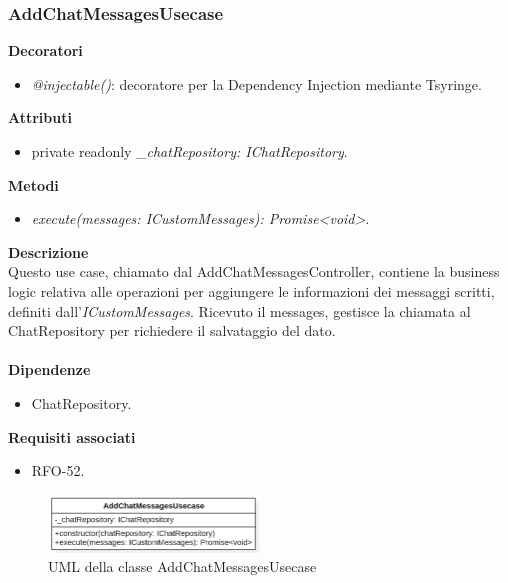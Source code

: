 \subsubsection{AddChatMessagesUsecase}
\textbf{Decoratori}
\begin{itemize}
    \item \textit{@injectable()}: decoratore per la Dependency Injection mediante Tsyringe.
\end{itemize}
\textbf{Attributi}
\begin{itemize}
    \item private readonly \textit{\_chatRepository: IChatRepository}.
\end{itemize}
\textbf{Metodi}
\begin{itemize}
    \item \textit{execute(messages: ICustomMessages): Promise<void>}.
\end{itemize}
\textbf{Descrizione}\\
Questo use case, chiamato dal AddChatMessagesController, contiene la business logic relativa alle operazioni per aggiungere le informazioni dei messaggi scritti, definiti dall'\textit{ICustomMessages}. Ricevuto il messages, gestisce la chiamata al ChatRepository per richiedere il salvataggio del dato.\\ \\
\textbf{Dipendenze}
\begin{itemize}
    \item ChatRepository.
\end{itemize}
\textbf{Requisiti associati}
\begin{itemize}[itemsep=-4pt]
    \item RFO-52.
\end{itemize}

\begin{figure}[h!]
    \centering  
    \includegraphics[width=0.5\textwidth]{AddChatMessagesUsecase.png}
    \caption{UML della classe AddChatMessagesUsecase}
\end{figure}

